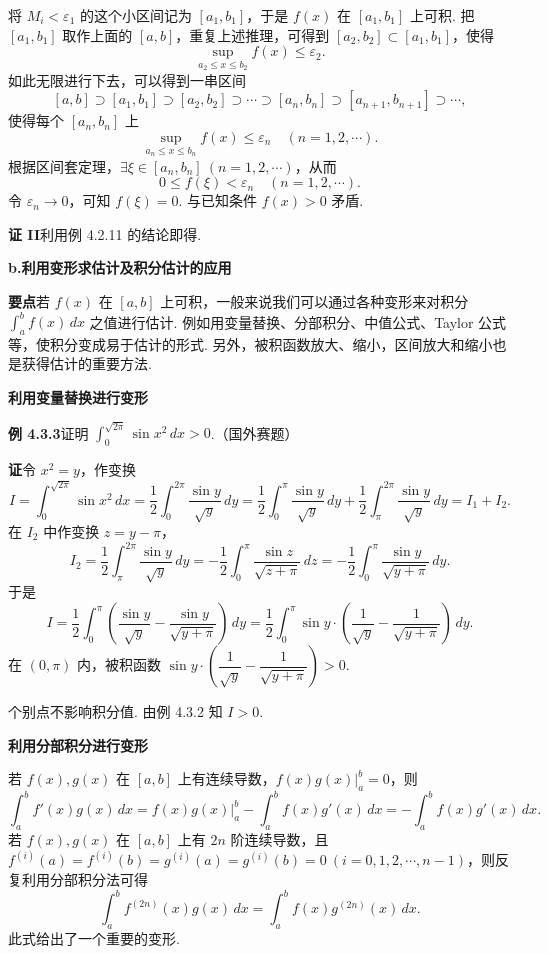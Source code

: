 \documentclass[UTF8, 12pt, fontset=fandol, oneside]{ctexart}
\begin{document}
将 $M_i<\varepsilon_1$ 的这个小区间记为 $[a_1,b_1]$，于是 $f(x)$ 在 $[a_1,b_1]$ 上可积. 把 $[a_1,b_1]$ 取作上面的 $[a,b]$，重复上述推理，可得到 $[a_2,b_2]\subset[a_1,b_1]$，使得
\[
\sup_{a_2\le x\le b_2} f(x)\le\varepsilon_2.
\]
如此无限进行下去，可以得到一串区间
\[
[a,b]\supset[a_1,b_1]\supset[a_2,b_2]\supset\cdots\supset[a_n,b_n]\supset[a_{n+1},b_{n+1}]\supset\cdots,
\]
使得每个 $[a_n,b_n]$ 上
\[
\sup_{a_n\le x\le b_n} f(x)\le\varepsilon_n\quad(n=1,2,\cdots).
\]
根据区间套定理，$\exists\xi\in[a_n,b_n]\ (n=1,2,\cdots)$，从而
\[
0\le f(\xi)<\varepsilon_n\quad(n=1,2,\cdots).
\]
令 $\varepsilon_n\to0$，可知 $f(\xi)=0$. 与已知条件 $f(x)>0$ 矛盾.

\noindent\textbf{证 II}\quad 利用例 4.2.11 的结论即得.

\noindent\textbf{b.\quad 利用变形求估计及积分估计的应用}

\noindent\textbf{要点}\quad 若 $f(x)$ 在 $[a,b]$ 上可积，一般来说我们可以通过各种变形来对积分 $\int_a^b f(x)\,dx$ 之值进行估计. 例如用变量替换、分部积分、中值公式、Taylor 公式等，使积分变成易于估计的形式. 另外，被积函数放大、缩小，区间放大和缩小也是获得估计的重要方法.

\noindent\textbf{利用变量替换进行变形}

\noindent\textbf{例 4.3.3}\quad 证明 $\int_0^{\sqrt{2\pi}}\sin x^2\,dx>0$.（国外赛题）

\noindent\textbf{证}\quad 令 $x^2=y$，作变换
\[
I=\int_0^{\sqrt{2\pi}}\sin x^2\,dx
=\frac12\int_0^{2\pi}\frac{\sin y}{\sqrt y}\,dy
=\frac12\int_0^\pi\frac{\sin y}{\sqrt y}\,dy
+\frac12\int_\pi^{2\pi}\frac{\sin y}{\sqrt y}\,dy
=I_1+I_2.
\]
在 $I_2$ 中作变换 $z=y-\pi$，
\[
I_2=\frac12\int_\pi^{2\pi}\frac{\sin y}{\sqrt y}\,dy
=-\frac12\int_0^\pi\frac{\sin z}{\sqrt{z+\pi}}\,dz
=-\frac12\int_0^\pi\frac{\sin y}{\sqrt{y+\pi}}\,dy.
\]
于是
\[
I=\frac12\int_0^\pi\left(\frac{\sin y}{\sqrt y}-\frac{\sin y}{\sqrt{y+\pi}}\right)\,dy
=\frac12\int_0^\pi\sin y\cdot\left(\frac1{\sqrt y}-\frac1{\sqrt{y+\pi}}\right)\,dy.
\]
在 $(0,\pi)$ 内，被积函数 $\sin y\cdot\left(\dfrac1{\sqrt y}-\dfrac1{\sqrt{y+\pi}}\right)>0$.

个别点不影响积分值. 由例 4.3.2 知 $I>0$.

\noindent\textbf{利用分部积分进行变形}

若 $f(x),g(x)$ 在 $[a,b]$ 上有连续导数，$f(x)g(x)\big|_a^b=0$，则
\[
\int_a^b f'(x)g(x)\,dx
=f(x)g(x)\bigg|_a^b-\int_a^b f(x)g'(x)\,dx
=-\int_a^b f(x)g'(x)\,dx.
\]
若 $f(x),g(x)$ 在 $[a,b]$ 上有 $2n$ 阶连续导数，且 $f^{(i)}(a)=f^{(i)}(b)=g^{(i)}(a)=g^{(i)}(b)=0\ (i=0,1,2,\cdots,n-1)$，则反复利用分部积分法可得
\[
\int_a^b f^{(2n)}(x)g(x)\,dx=\int_a^b f(x)g^{(2n)}(x)\,dx.
\tag{A}
\]
此式给出了一个重要的变形.
\end{document}
